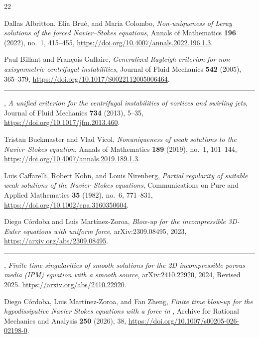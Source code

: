 \begin{thebibliography}{22}
\small
\setlength{\itemsep}{0pt}
\setlength{\parsep}{0pt}
\setlength{\parskip}{0pt}

Dallas Albritton, Elia Brué, and Maria Colombo,
\emph{Non-uniqueness of Leray solutions of the forced Navier--Stokes equations},
Annals of Mathematics \textbf{196} (2022), no.~1, 415--455,
\url{https://doi.org/10.4007/annals.2022.196.1.3}.

Paul Billant and François Gallaire,
\emph{Generalized Rayleigh criterion for non-axisymmetric centrifugal instabilities},
Journal of Fluid Mechanics \textbf{542} (2005), 365--379,
\url{https://doi.org/10.1017/S0022112005006464}.

\rule[0.5ex]{2em}{0.4pt},
\emph{A unified criterion for the centrifugal instabilities of vortices and swirling jets},
Journal of Fluid Mechanics \textbf{734} (2013), 5--35,
\url{https://doi.org/10.1017/jfm.2013.460}.

Tristan Buckmaster and Vlad Vicol,
\emph{Nonuniqueness of weak solutions to the Navier--Stokes equation},
Annals of Mathematics \textbf{189} (2019), no.~1, 101--144,
\url{https://doi.org/10.4007/annals.2019.189.1.3}.

Luis Caffarelli, Robert Kohn, and Louis Nirenberg,
\emph{Partial regularity of suitable weak solutions of the Navier--Stokes equations},
Communications on Pure and Applied Mathematics \textbf{35} (1982), no.~6,
771--831, \url{https://doi.org/10.1002/cpa.3160350604}.

Diego Córdoba and Luis Martínez-Zoroa,
\emph{Blow-up for the incompressible 3D-Euler equations with uniform
 force},
arXiv:2309.08495, 2023, \url{https://arxiv.org/abs/2309.08495}.

\rule[0.5ex]{2em}{0.4pt},
\emph{Finite time singularities of smooth solutions for the 2D incompressible porous media (IPM) equation with a smooth source},
arXiv:2410.22920, 2024, Revised 2025.
\url{https://arxiv.org/abs/2410.22920}.

Diego Córdoba, Luis Martínez-Zoroa, and Fan Zheng,
\emph{Finite time blow-up for the hypodissipative Navier Stokes equations with a force in
},
Archive for Rational Mechanics and Analysis \textbf{250} (2026), 38,
\url{https://doi.org/10.1007/s00205-026-02198-0}.


\end{thebibliography}
